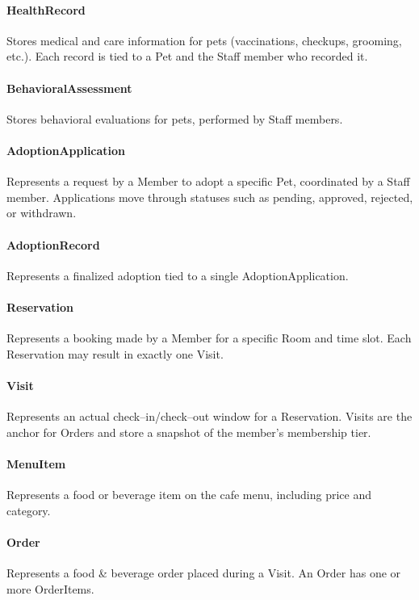 \documentclass[11pt]{article}
\begin{document}
\paragraph{HealthRecord}
Stores medical and care information for pets (vaccinations, checkups, grooming, etc.).
Each record is tied to a Pet and the Staff member who recorded it.

\paragraph{BehavioralAssessment}
Stores behavioral evaluations for pets, performed by Staff members.

\paragraph{AdoptionApplication}
Represents a request by a Member to adopt a specific Pet, coordinated by a Staff member.
Applications move through statuses such as pending, approved, rejected, or withdrawn.

\paragraph{AdoptionRecord}
Represents a finalized adoption tied to a single AdoptionApplication.

\paragraph{Reservation}
Represents a booking made by a Member for a specific Room and time slot.
Each Reservation may result in exactly one Visit.

\paragraph{Visit}
Represents an actual check--in/check--out window for a Reservation.
Visits are the anchor for Orders and store a snapshot of the member's membership tier.

\paragraph{MenuItem}
Represents a food or beverage item on the cafe menu, including price and category.

\paragraph{Order}
Represents a food \& beverage order placed during a Visit.
An Order has one or more OrderItems.
\end{document}
